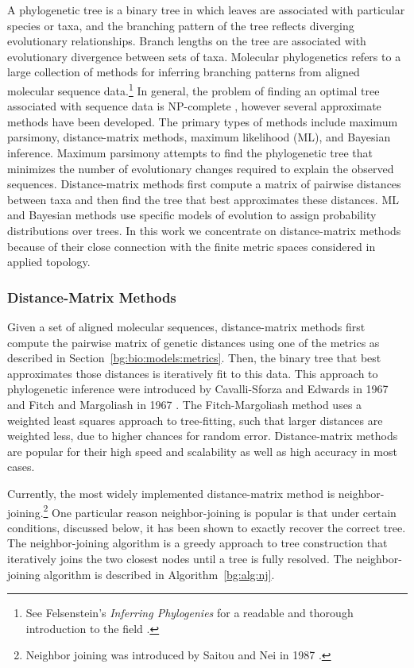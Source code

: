 A phylogenetic tree is a binary tree in which leaves are associated with particular species or taxa, and the branching pattern of the tree reflects diverging evolutionary relationships.
Branch lengths on the tree are associated with evolutionary divergence between sets of taxa.
Molecular phylogenetics refers to a large collection of methods for inferring branching patterns from aligned molecular sequence data.\footnote{See Felsenstein's \emph{Inferring Phylogenies} for a readable and thorough introduction to the field \cite{Felsenstein:2004ws}.}
In general, the problem of finding an optimal tree associated with sequence data is NP-complete \cite{Foulds:1982fn}, however several approximate methods have been developed.
The primary types of methods include maximum parsimony, distance-matrix methods, maximum likelihood (ML), and Bayesian inference.
Maximum parsimony attempts to find the phylogenetic tree that minimizes the number of evolutionary changes required to explain the observed sequences.
Distance-matrix methods first compute a matrix of pairwise distances between taxa and then find the tree that best approximates these distances.
ML and Bayesian methods use specific models of evolution to assign probability distributions over trees.
In this work we concentrate on distance-matrix methods because of their close connection with the finite metric spaces considered in applied topology.

\subsubsection{Distance-Matrix Methods}
\label{bg:bio:phylo:distance}

Given a set of aligned molecular sequences, distance-matrix methods first compute the pairwise matrix of genetic distances using one of the metrics as described in Section~\ref{bg:bio:models:metrics}.
Then, the binary tree that best approximates those distances is iteratively fit to this data.
This approach to phylogenetic inference were introduced by Cavalli-Sforza and Edwards in 1967 \cite{CavalliSforza:1967th} and Fitch and Margoliash in 1967 \cite{Fitch:1967we}.
The Fitch-Margoliash method uses a weighted least squares approach to tree-fitting, such that larger distances are weighted less, due to higher chances for random error.
Distance-matrix methods are popular for their high speed and scalability as well as high accuracy in most cases.

Currently, the most widely implemented distance-matrix method is neighbor-joining.\footnote{Neighbor joining was introduced by Saitou and Nei in 1987 \cite{Saitou:1987wo}.}
One particular reason neighbor-joining is popular is that under certain conditions, discussed below, it has been shown to exactly recover the correct tree.
The neighbor-joining algorithm is a greedy approach to tree construction that iteratively joins the two closest nodes until a tree is fully resolved.
The neighbor-joining algorithm is described in Algorithm~\ref{bg:alg:nj}.

